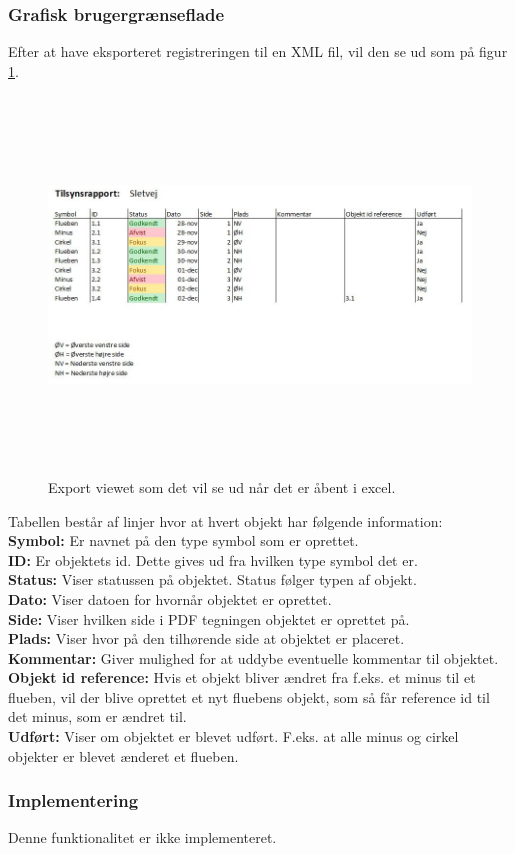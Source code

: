 \subsubsection{Grafisk brugergrænseflade}
Efter at have eksporteret registreringen til en XML fil, vil den se ud som på figur \ref{fig:Excel}.
\begin{figure}[H] %
	\centering
	\includegraphics[height=10cm, width=17cm]{../ArkitekturDesign/Design/Eksportering/Excel}
	\caption{Export viewet som det vil se ud når det er åbent i excel.}
	\label{fig:Excel}
\end{figure}
Tabellen består af linjer hvor at hvert objekt har følgende information: \\
\textbf{Symbol:} Er navnet på den type symbol som er oprettet. \\
\textbf{ID:} Er objektets id. Dette gives ud fra hvilken type symbol det er. \\
\textbf{Status:} Viser statussen på objektet. Status følger typen af objekt. \\
\textbf{Dato:} Viser datoen for hvornår objektet er oprettet. \\
\textbf{Side:} Viser hvilken side i PDF tegningen objektet er oprettet på. \\
\textbf{Plads:} Viser hvor på den tilhørende side at objektet er placeret. \\
\textbf{Kommentar:} Giver mulighed for at uddybe eventuelle kommentar til objektet. \\
\textbf{Objekt id reference:} Hvis et objekt bliver ændret fra f.eks. et minus til et flueben, vil der blive oprettet et nyt fluebens objekt, som så får reference id til det minus, som er ændret til. \\
\textbf{Udført:} Viser om objektet er blevet udført. F.eks. at alle minus og cirkel objekter er blevet ænderet et flueben. \\

\subsubsection{Implementering}
Denne funktionalitet er ikke implementeret.

\clearpage